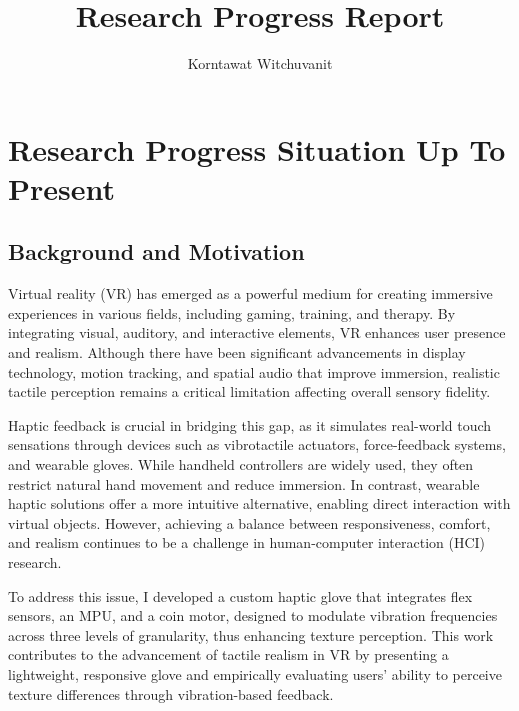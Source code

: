 \documentclass[graybox]{svmult}
\begin{document}
\title*{\centering Research Progress Report}

\author{\hfill Korntawat Witchuvanit}


\maketitle
\vspace{-100pt} 

\section{Research Progress Situation Up To Present}\label{sec:Present Research}



\subsection{Background and Motivation}\label{sec:BG}
Virtual reality (VR) has emerged as a powerful medium for creating immersive experiences in various fields, including gaming, training, and therapy. By integrating visual, auditory, and interactive elements, VR enhances user presence and realism. Although there have been significant advancements in display technology, motion tracking, and spatial audio that improve immersion, realistic tactile perception remains a critical limitation affecting overall sensory fidelity.

Haptic feedback is crucial in bridging this gap, as it simulates real-world touch sensations through devices such as vibrotactile actuators, force-feedback systems, and wearable gloves. While handheld controllers are widely used, they often restrict natural hand movement and reduce immersion. In contrast, wearable haptic solutions offer a more intuitive alternative, enabling direct interaction with virtual objects. However, achieving a balance between responsiveness, comfort, and realism continues to be a challenge in human-computer interaction (HCI) research.

To address this issue, I developed a custom haptic glove that integrates flex sensors, an MPU, and a coin motor, designed to modulate vibration frequencies across three levels of granularity, thus enhancing texture perception. This work contributes to the advancement of tactile realism in VR by presenting a lightweight, responsive glove and empirically evaluating users' ability to perceive texture differences through vibration-based feedback.
\end{document}

